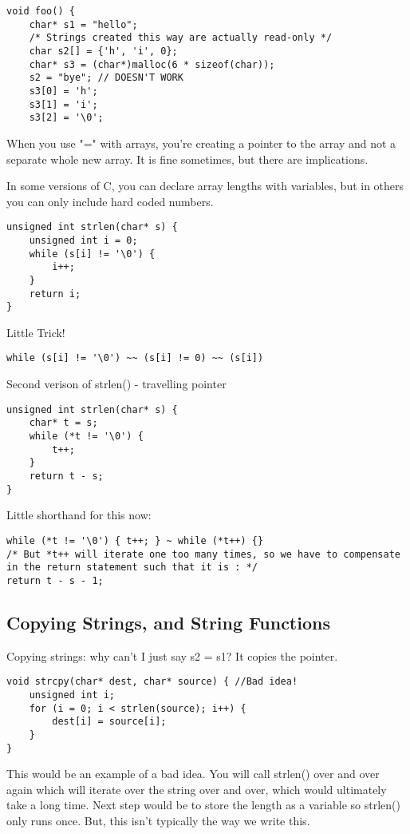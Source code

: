 \documentclass[12pt]{article}
\theoremstyle{definition}
\begin{document}
\begin{lstlisting}
void foo() {
    char* s1 = "hello";
    /* Strings created this way are actually read-only */
    char s2[] = {'h', 'i', 0};
    char* s3 = (char*)malloc(6 * sizeof(char));
    s2 = "bye"; // DOESN'T WORK
    s3[0] = 'h';
    s3[1] = 'i';
    s3[2] = '\0';
\end{lstlisting}
When you use "=" with arrays, you're creating a pointer to the array and not a separate whole new array. It is fine sometimes, but there are implications.

In some versions of C, you can declare array lengths with variables, but in others you can only include hard coded numbers. 

\begin{lstlisting}
unsigned int strlen(char* s) {
    unsigned int i = 0;
    while (s[i] != '\0') {
        i++;
    }
    return i;
}

\end{lstlisting}

Little Trick!
\begin{lstlisting}
while (s[i] != '\0') ~~ (s[i] != 0) ~~ (s[i])
\end{lstlisting}

Second verison of strlen() - travelling pointer
\begin{lstlisting}
unsigned int strlen(char* s) {
    char* t = s;
    while (*t != '\0') {
        t++;
    }
    return t - s;
}    
\end{lstlisting}
Little shorthand for this now:
\begin{lstlisting}
while (*t != '\0') { t++; } ~ while (*t++) {}
/* But *t++ will iterate one too many times, so we have to compensate in the return statement such that it is : */
return t - s - 1;

\end{lstlisting}
\subsection{Copying Strings, and String Functions}
Copying strings: why can't I just say s2 = s1? It copies the pointer.
\begin{lstlisting}
void strcpy(char* dest, char* source) { //Bad idea!
    unsigned int i;
    for (i = 0; i < strlen(source); i++) {
        dest[i] = source[i];
    }     
}
\end{lstlisting}
This would be an example of a bad idea. You will call strlen() over and over again which will iterate over the string over and over, which would ultimately take a long time. Next step would be to store the length as a variable so strlen() only runs once. But, this isn't typically the way we write this. 
\end{document}
